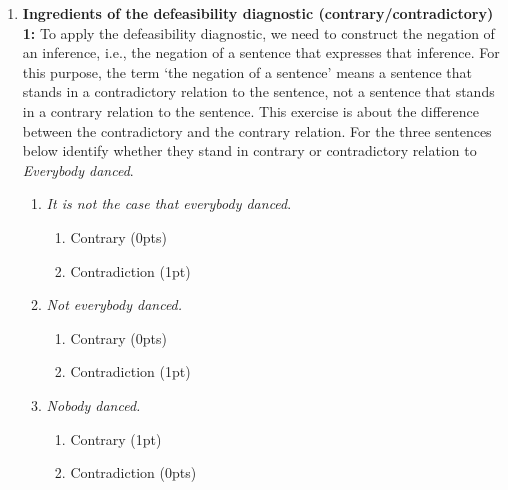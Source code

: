 \documentclass[a4,11pt]{article}
\begin{document}
\begin{enumerate}[leftmargin = 12pt]
  {\bf Model answer:} The correct answer is the one where we combine the sentence A (which gives rise to the inference B) with the negation of the inference (e.g., A and not B). We do not change the original sentence A in the defeasibility diagnostic because we want to diagnose whether B is entailed from A; the negation of A is not relevant for this diagnostic. We combine A with the negation of B because if A entails B, then an example like ``A and not B'' is self-contradictory. That's why we have to negate B.
 
\item {\bf Ingredients of the defeasibility diagnostic (contrary/contradictory) 1:} To apply the defeasibility diagnostic, we need to construct the negation of an inference, i.e., the negation of a sentence that expresses that inference. For this purpose, the term `the negation of a sentence' means a sentence that stands in a contradictory relation to the sentence, not a sentence that stands in a contrary relation to the sentence. This exercise is about the difference between the contradictory and the contrary relation. For the three sentences below identify whether they stand in contrary or contradictory relation to \textit{Everybody danced}.

\begin{enumerate}[noitemsep]
    \item \textit{It is not the case that everybody danced}.
    \begin{enumerate}
        \item Contrary (0pts)
        \item Contradiction (1pt)
    \end{enumerate}
     \item \textit{Not everybody danced.}
         \begin{enumerate}
        \item Contrary (0pts)
        \item Contradiction (1pt)
    \end{enumerate}
     \item \textit{Nobody danced.}
         \begin{enumerate}
        \item Contrary (1pt)
        \item Contradiction (0pts)
    \end{enumerate}
\end{enumerate}


\end{enumerate}
\end{document}
